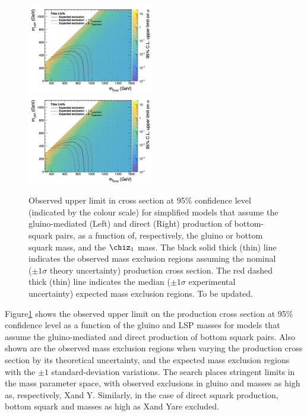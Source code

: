 \begin{figure}[thp!]
  \begin{center}
    \includegraphics[width=0.49\textwidth]{T2bb.pdf} ~
    \includegraphics[width=0.49\textwidth]{T2bb.pdf} \\
    \caption{Observed upper limit in cross section at 95\% confidence
      level (indicated by the colour scale) for simplified models that
      assume the gluino-mediated (Left) and direct (Right) production
      of bottom-squark pairs, as a function of, respectively, the
      gluino or bottom squark mass, and the $\chiz_{1}$ mass. The
      black solid thick (thin) line indicates the observed mass
      exclusion regions assuming the nominal (${\pm}1 \sigma$ theory
      uncertainty) production cross section. The red dashed thick
      (thin) line indicates the median (${\pm}1 \sigma$ experimental
      uncertainty) expected mass exclusion regions. {\color{red} To be
        updated. } }
      \label{fig:limits-sms} 
  \end{center}
\end{figure}

Figure\ref{fig:limits-sms} shows the observed upper limit on the
production cross section at 95\% confidence level as a function of the
gluino and LSP masses for models that assume the gluino-mediated and
direct production of bottom squark pairs. Also shown are the observed
mass exclusion regions when varying the production cross section by
its theoretical uncertainty, and the expected mass exclusion regions
with the ${\pm}1$ standard-deviation variations. The search places
stringent limits in the mass parameter space, with observed exclusions
in gluino and \chiz masses as high as, respectively, X\gev and
Y\gev. Similarly, in the case of direct squark production, bottom
squark and \chiz masses as high as X\gev and Y\gev are excluded.

